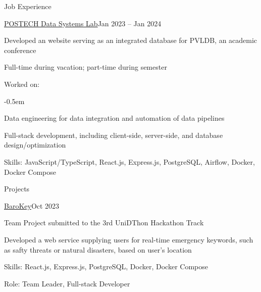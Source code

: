 \documentclass{resume}
\begin{document}
\begin{rSection}{Job Experience}
    \begin{rSubsection}{\href{https://dslab.postech.ac.kr/}{POSTECH Data
        Systems Lab}}{Jan 2023 -- Jan 2024}

        {\bfseries{}}

        \item Developed an website serving as an integrated database for PVLDB,
            an academic conference

        \item Full-time during vacation; part-time during semester

        \item Worked on:

        \vspace{-0.5em}
        \begin{list}{--}{}
            \itemsep -0.5em

            \item Data engineering for data integration and automation of data
                pipelines

            \item Full-stack development, including client-side, server-side,
                and database design/optimization 
        \end{list}

        \item Skills: JavaScript/TypeScript, React.js, Express.js, PostgreSQL,
            Airflow, Docker, Docker Compose
    \end{rSubsection}
\end{rSection}

\begin{rSection}{Projects}

    \begin{rSubsection}{\href{https://github.com/UniD3-Hackathon-Team4/barokey}
        {BaroKey}}{Oct 2023}

        Team Project submitted to the 3rd UniDThon Hackathon Track

        \item Developed a web service supplying users for real-time emergency
            keywords, such as safty threats or natural disasters, based on
            user's location

        \item Skills: React.js, Express.js, PostgreSQL, Docker, Docker Compose

        \item Role: Team Leader, Full-stack Developer
    \end{rSubsection}
\end{rSection}
\end{document}
